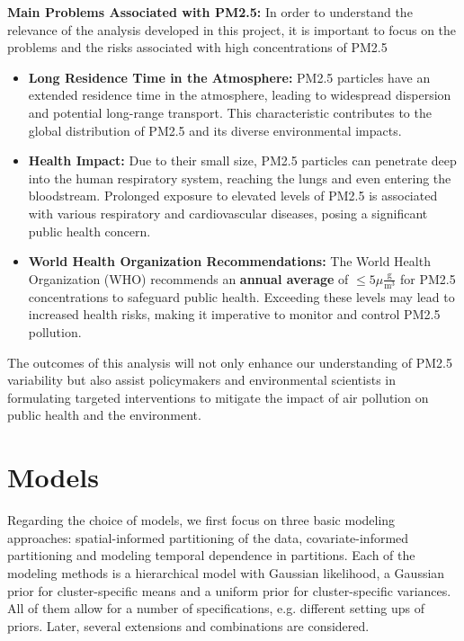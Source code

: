 \documentclass[12pt,a4paper]{article}
\begin{document}
\textbf{Main Problems Associated with PM2.5:}
In order to understand the relevance of the analysis developed in this project, it is important to focus on the problems and the risks associated with high concentrations of PM2.5
\begin{itemize}
    \item \textbf{Long Residence Time in the Atmosphere:} PM2.5 particles have an extended residence time in the atmosphere, leading to widespread dispersion and potential long-range transport. This characteristic contributes to the global distribution of PM2.5 and its diverse environmental impacts.

    \item \textbf{Health Impact:} Due to their small size, PM2.5 particles can penetrate deep into the human respiratory system, reaching the lungs and even entering the bloodstream. Prolonged exposure to elevated levels of PM2.5 is associated with various respiratory and cardiovascular diseases, posing a significant public health concern.

    \item \textbf{World Health Organization Recommendations:} The World Health Organization (WHO) recommends an \textbf{annual average} of $\leq 5\mu \frac{\mathrm{g}}{\mathrm{m}^3}$ for PM2.5 concentrations to safeguard public health. Exceeding these levels may lead to increased health risks, making it imperative to monitor and control PM2.5 pollution.
\end{itemize}

The outcomes of this analysis will not only enhance our understanding of PM2.5 variability but also assist policymakers and environmental scientists in formulating targeted interventions to mitigate the impact of air pollution on public health and the environment.


\section{Models}

Regarding the choice of models, we first focus on three basic modeling approaches: spatial-informed partitioning of the data, covariate-informed partitioning and modeling temporal dependence in partitions. Each of the modeling methods is a hierarchical model with Gaussian likelihood, a Gaussian prior for cluster-specific means and a uniform prior for cluster-specific variances. All of them allow for a number of specifications, e.g. different setting ups of priors. Later, several extensions and combinations are considered.
\end{document}

